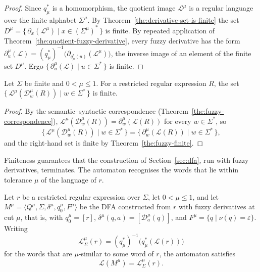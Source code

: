 \begin{proof}
Since $q_\mu^{*}$ is a homomorphism, the quotient image $\mathcal{L}^{\mu}$ is a
regular language over the finite alphabet $\Sigma^{\mu}$. By
Theorem~\ref{the:derivative-set-is-finite} the set
$D^{\mu}=\{\,\partial_x(\mathcal{L}^{\mu})\mid x\in(\Sigma^{\mu})^{*}\,\}$ is finite.
By repeated application of Theorem~\ref{the:quotient-fuzzy-derivative}, every fuzzy
derivative has the form
$\partial_u^{\mu}(\mathcal{L})=(q_\mu^{*})^{-1}\bigl(\partial_{q_\mu^{*}(u)}(\mathcal{L}^{\mu})\bigr)$,
the inverse image of an element of the finite set $D^{\mu}$. Ergo
$\{\,\partial_u^{\mu}(\mathcal{L})\mid u\in\Sigma^{*}\,\}$ is finite.
\end{proof}

\begin{theorem}\label{the:fuzzy-finite-expr}
Let $\Sigma$ be finite and $0<\mu\le1$. For a restricted regular expression $R$, the
set $\bigl\{\,\mathcal{L}^{\mu}(\mathcal{D}_w^{\mu}(R))\mid w\in\Sigma^{*}\,\bigr\}$
is finite.
\end{theorem}

\begin{proof}
By the semantic--syntactic correspondence (Theorem~\ref{the:fuzzy-correspondence}),
$\mathcal{L}^{\mu}(\mathcal{D}_w^{\mu}(R))=\partial_w^{\mu}(\mathcal{L}(R))$ for every
$w\in\Sigma^{*}$, so
\[
\bigl\{\,\mathcal{L}^{\mu}(\mathcal{D}_w^{\mu}(R))\mid w\in\Sigma^{*}\,\bigr\}
= \bigl\{\,\partial_w^{\mu}(\mathcal{L}(R))\mid w\in\Sigma^{*}\,\bigr\},
\]
and the right-hand set is finite by Theorem~\ref{the:fuzzy-finite}.
\end{proof}

Finiteness guarantees that the construction of Section~\ref{sec:dfa}, run with fuzzy
derivatives, terminates. The automaton recognises the words that lie
within tolerance $\mu$ of the language of $r$.

\begin{theorem}\label{the:fuzzy-dfa}
Let $r$ be a restricted regular expression over $\Sigma$, let $0<\mu\le1$, and let
$M^{\mu}=\langle Q^{\mu},\Sigma,\delta^{\mu},q_0^{\mu},F^{\mu}\rangle$ be the DFA
constructed from $r$ with fuzzy derivatives at cut $\mu$, that is, with
$q_0^{\mu}=[r]$, $\delta^{\mu}(q,a)=[\mathcal{D}_a^{\mu}(q)]$, and
$F^{\mu}=\{q\mid \nu(q)=\varepsilon\}$. Writing
\[
\mathcal{L}_\Sigma^{\mu}(r)=(q_\mu^{*})^{-1}\bigl(q_\mu^{*}(\mathcal{L}(r))\bigr)
\]
for the words that are $\mu$-similar to some word of $r$, the automaton satisfies
\[
\mathcal{L}(M^{\mu})=\mathcal{L}_\Sigma^{\mu}(r).
\]
\end{theorem}

